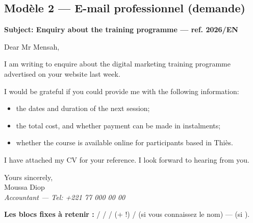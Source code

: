 \subsection{Modèle 2 --- E-mail professionnel (demande)}
\begin{dialoguebox}
\begin{anglais}
\textbf{Subject: Enquiry about the training programme --- ref. 2026/EN}

Dear Mr Mensah,

I am writing to enquire about the digital marketing training programme advertised on your
website last week.

I would be grateful if you could provide me with the following information:
\begin{itemize}
  \item the dates and duration of the next session;
  \item the total cost, and whether payment can be made in instalments;
  \item whether the course is available online for participants based in Thiès.
\end{itemize}

I have attached my CV for your reference. I look forward to hearing from you.

Yours sincerely,\\
Moussa Diop\\
\textit{Accountant --- Tel: +221 77 000 00 00}
\end{anglais}
\end{dialoguebox}
\textbf{Les blocs fixes à retenir :}  /
 /  /
 (+  !) /
 (si vous connaissez le nom) ---  (si
).


